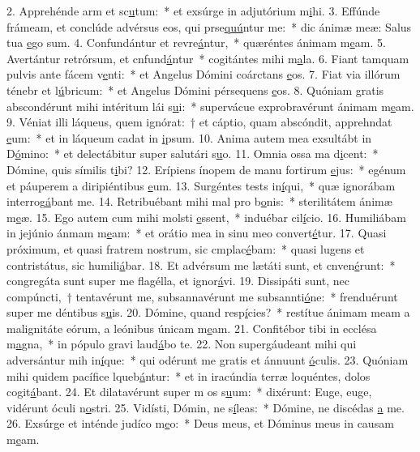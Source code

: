 2. Apprehénde arm et sc\uline{u}tum:~* et exsúrge in adjutórium m\uline{i}hi.
3. Effúnde frámeam, et conclúde advérsus eos, qui prse\uline{quú}ntur me:~* dic ánimæ meæ: Salus tua \uline{e}go sum.
4. Confundántur et revre\uline{á}ntur,~* quæréntes ánimam m\uline{e}am.
5. Avertántur retrórsum, et cnfund\uline{á}ntur~* cogitántes mihi m\uline{a}la.
6. Fiant tamquam pulvis ante fácem v\uline{e}nti:~* et Angelus Dómini coárctans \uline{e}os.
7. Fiat via illórum ténebr et l\uline{ú}bricum:~* et Angelus Dómini pérsequens \uline{e}os.
8. Quóniam gratis abscondérunt mihi intéritum lái s\uline{u}i:~* supervácue exprobravérunt ánimam m\uline{e}am.
9. Véniat illi láqueus, quem ignórat:~† et cáptio, quam abscóndit, apprehndat \uline{e}um:~* et in láqueum cadat in \uline{i}psum.
10. Anima autem mea exsultábt in D\uline{ó}mino:~* et delectábitur super salutári s\uline{u}o.
11. Omnia ossa ma d\uline{i}cent:~* Dómine, quis símilis t\uline{i}bi?
12. Erípiens ínopem de manu fortirum \uline{e}jus:~* egénum et páuperem a diripiéntibus \uline{e}um.
13. Surgéntes tests in\uline{í}qui,~* quæ ignorábam interrog\uline{á}bant me.
14. Retribuébant mihi mal pro b\uline{o}nis:~* sterilitátem ánimæ m\uline{e}æ.
15. Ego autem cum mihi molsti \uline{e}ssent,~* induébar cil\uline{í}cio.
16. Humiliábam in jejúnio ánmam m\uline{e}am:~* et orátio mea in sinu meo convert\uline{é}tur.
17. Quasi próximum, et quasi fratrem nostrum, sic cmplac\uline{é}bam:~* quasi lugens et contristátus, sic humili\uline{á}bar.
18. Et advérsum me lætáti sunt, et cnven\uline{é}runt:~* congregáta sunt super me flagélla, et ignor\uline{á}vi.
19. Dissipáti sunt, nec compúncti,~† tentavérunt me, subsannavérunt me subsannti\uline{ó}ne:~* frenduérunt super me déntibus s\uline{u}is.
20. Dómine, quand resp\uline{í}cies?~* restítue ánimam meam a malignitáte eórum, a leónibus únicam m\uline{e}am.
21. Confitébor tibi in ecclésa m\uline{a}gna,~* in pópulo gravi laud\uline{á}bo te.
22. Non supergáudeant mihi qui adversántur mih in\uline{í}que:~* qui odérunt me gratis et ánnuunt \uline{ó}culis.
23. Quóniam mihi quidem pacífice lqueb\uline{á}ntur:~* et in iracúndia terræ loquéntes, dolos cogit\uline{á}bant.
24. Et dilatavérunt super m os s\uline{u}um:~* dixérunt: Euge, euge, vidérunt óculi n\uline{o}stri.
25. Vidísti, Dómin, ne s\uline{í}leas:~* Dómine, ne discédas \uline{a} me.
26. Exsúrge et inténde judíco m\uline{e}o:~* Deus meus, et Dóminus meus in causam m\uline{e}am.

